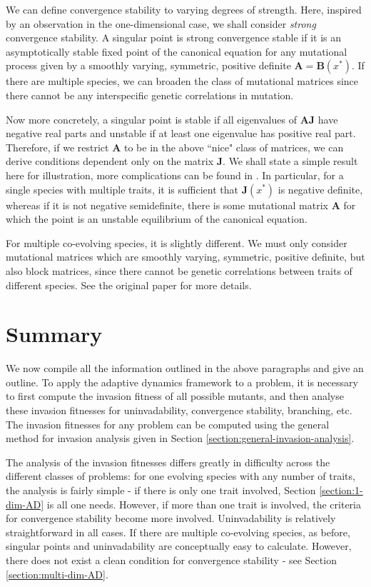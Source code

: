 We can define convergence stability to varying degrees of strength. 
Here, inspired by an observation in the one-dimensional case, we shall consider \textit{strong} convergence stability.
A singular point is strong convergence stable if it is an asymptotically stable fixed point of the canonical equation for any mutational process given by a smoothly varying, symmetric, positive definite $\mathbf{A}=\mathbf{B}(x^*)$.
If there are multiple species, we can broaden the class of mutational matrices since there cannot be any interspecific genetic correlations in mutation.

Now more concretely, a singular point is stable if all eigenvalues of $\mathbf{AJ}$ have negative real parts and unstable if at least one eigenvalue has positive real part. 
Therefore, if we restrict $\mathbf{A}$ to be in the above ``nice" class of matrices, we can derive conditions dependent only on the matrix $\mathbf{J}$. 
We shall state a simple result here for illustration, more complications can be found in \cite{leimar_multidimensional_2009}.
In particular, for a single species with multiple traits, it is sufficient that $\mathbf{J}(x^*)$ is negative definite, whereas if it is not negative semidefinite, there is some mutational matrix $\mathbf{A}$ for which the point is an unstable equilibrium of the canonical equation. 

For multiple co-evolving species, it is slightly different.
We must only consider mutational matrices which are smoothly varying, symmetric, positive definite, but also block matrices, since there cannot be genetic correlations between traits of different species.
See the original paper \citep{leimar_multidimensional_2009} for more details. 

\section{Summary}
\label{section:summary}

We now compile all the information outlined in the above paragraphs and give an outline. 
To apply the adaptive dynamics framework to a problem, it is necessary to first compute the invasion fitness of all possible mutants, and then analyse these invasion fitnesses for uninvadability, convergence stability, branching, etc. 
The invasion fitnesses for any problem can be computed using the general method for invasion analysis given in Section \ref{section:general-invasion-analysis}. 

The analysis of the invasion fitnesses differs greatly in difficulty across the different classes of problems: for one evolving species with any number of traits, the analysis is fairly simple - if there is only one trait involved, Section \ref{section:1-dim-AD} is all one needs. 
However, if more than one trait is involved, the criteria for convergence stability become more involved. 
Uninvadability is relatively straightforward in all cases. 
If there are multiple co-evolving species, as before, singular points and uninvadability are conceptually easy to calculate. 
However, there does not exist a clean condition for convergence stability - see Section \ref{section:multi-dim-AD}.  

